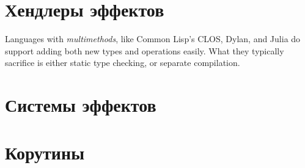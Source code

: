 \documentclass[12pt]{article}
\begin{document}





    \section{Хендлеры эффектов} \label{sec:effect-handlers}









    Languages with \textit{multimethods}, like Common Lisp’s CLOS, Dylan, and Julia do support adding both new types and operations easily.
    What they typically sacrifice is either static type checking, or separate compilation.





    \section{Системы эффектов} \label{sec:effect-systems}



    \section{Корутины}


\end{document}

